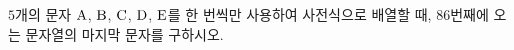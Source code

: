 $5$개의 문자 $\mathrm{A}$, $\mathrm{B}$, $\mathrm{C}$, $\mathrm{D}$, $\mathrm{E}$를 한 번씩만 사용하여 사전식으로 배열할 때, $86$번째에 오는 문자열의 마지막 문자를 구하시오.
